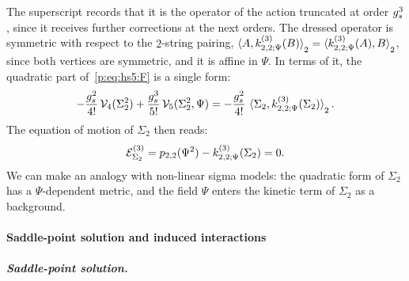 The superscript records that it is the operator of the action truncated at order $g_s^3$, since it receives further corrections at the next orders.
The dressed operator is symmetric with respect to the $2$-string pairing, $\pair[2]{A}{\kin{2}{\Psi}{3}(B)} = \pair[2]{\kin{2}{\Psi}{3}(A)}{B}$, since both vertices are symmetric, and it is affine in $\Psi$.
In terms of it, the quadratic part of~\eqref{p:eq:hs5:F} is a single form:
\begin{equation}
  \label{p:eq:hs5:F-dressed}
  - \frac{\gs^2}{4!} \, \vertex{4}(\Sigma_2^2)
    + \frac{\gs^3}{5!} \, \vertex{5}(\Sigma_2^2, \Psi)
    = - \frac{\gs^2}{4!} \, \pair[2]{\Sigma_2}{\kin{2}{\Psi}{3}(\Sigma_2)}.
\end{equation}
The equation of motion of $\Sigma_2$ then reads:
\begin{equation}
  \label{p:eq:hs5:eom-sigma-dressed}
  \mathcal E^{(3)}_{\Sigma_2}
    = \sprod{2}{2}(\Psi^2) - \kin{2}{\Psi}{3}(\Sigma_2)
    = 0.
\end{equation}
We can make an analogy with non-linear sigma models: the quadratic form of $\Sigma_2$ has a $\Psi$-dependent metric, and the field $\Psi$ enters the kinetic term of $\Sigma_2$ as a background.


\paragraph{Saddle-point solution and induced interactions}

\subparagraph{Saddle-point solution.}

